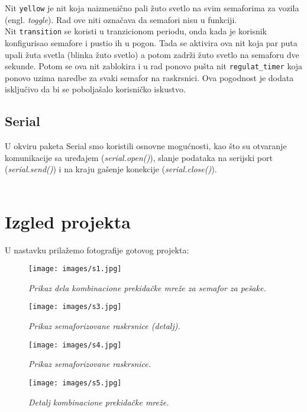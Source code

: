 \documentclass[a4paper,12pt, projekat]{etf}
\begin{document}
Nit \verb|yellow| je nit koja naizmenično pali žuto svetlo na svim semaforima za vozila (engl. \textit{toggle}). Rad ove niti označava da semafori nisu u funkciji.\\

Nit \verb|transition| se koristi u tranzicionom periodu, onda kada je korisnik konfigurisao semafore i pustio ih u pogon. Tada se aktivira ova nit koja par puta upali žuta svetla (blinka žuto svetlo) a potom zadrži žuto svetlo na semaforu dve sekunde. Potom se ova nit zablokira i u rad ponovo pušta nit \verb|regulat_timer| koja ponovo uzima naredbe za svaki semafor na raskrsnici. Ova pogodnost je dodata isključivo da bi se poboljašalo korisničko iskustvo.

\subsection{Serial}
U okviru paketa Serial smo koristili osnovne mogućnosti, kao što su otvaranje komunikacije sa uređajem (\textit{serial.open()}), slanje podataka na serijski port (\textit{serial.send()}) i na kraju gašenje konekcije (\textit{serial.close()}).\\
\\

\section{Izgled projekta}
U nastavku prilažemo fotografije gotovog projekta:

\begin{figure}[!htb]
\centering
\texttt{[image: images/s1.jpg]}
\caption{\emph{Prikaz dela kombinacione prekidačke mreže za semafor za pešake.}}
\label{fig:im1}
\end{figure}

\begin{figure}[!htb]
\centering
\texttt{[image: images/s3.jpg]}
\caption{\emph{Prikaz semaforizovane raskrsnice (detalj).}}
\label{fig:im2}
\end{figure}

\begin{figure}[!htb]
\centering
\texttt{[image: images/s4.jpg]}
\caption{\emph{Prikaz semaforizovane raskrsnice.}}
\label{fig:im3}
\end{figure}

\begin{figure}[!htb]
\centering
\texttt{[image: images/s5.jpg]}
\caption{\emph{Detalj kombinacione prekidačke mreže.}}
\label{fig:im3}
\end{figure}
\end{document}
